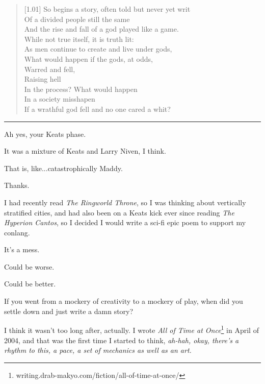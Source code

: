\begin{paracol}{2}
\begin{leftcolumn}
\begin{verse}[1.01\textwidth]
So begins a story, often told but never yet writ\\
\vin Of a divided people still the same\\
\vin And the rise and fall of a god played like a game.\\
While not true itself, it is truth lit:\\
\vin As men continue to create and live under gods,\\
\vin What would happen if the gods, at odds,\\
\vin \vin Warred and fell,\\
\vin \vin Raising hell\\
\vin In the process? What would happen\\
\vin In a society misshapen\\
If a wrathful god fell and no one cared a whit?
\end{verse}

\begin{center}
\rule{1in}{0.1pt}
\end{center}

\begin{ally}
Ah yes, your Keats phase.
\end{ally}
It was a mixture of Keats and Larry Niven, I think.

\begin{ally}
That is, like...catastrophically Maddy.
\end{ally}
Thanks.

I had recently read \emph{The Ringworld Throne}, so I was thinking about vertically stratified cities, and had also been on a Keats kick ever since reading \emph{The Hyperion Cantos}, so I decided I would write a sci-fi epic poem to support my conlang.

It's a mess.

\begin{ally}
Could be worse.
\end{ally}
Could be better.
\newpage

\begin{ally}
If you went from a mockery of creativity to a mockery of play, when did you settle down and just write a damn story?
\end{ally}
I think it wasn't too long after, actually. I wrote \emph{All of Time at Once}\footnote{writing.drab-makyo.com/fiction/all-of-time-at-once/} in April of 2004, and that was the first time I started to think, \emph{ah-hah, okay, there's a rhythm to this, a pace, a set of mechanics as well as an art.}


\end{leftcolumn}
\end{paracol}
